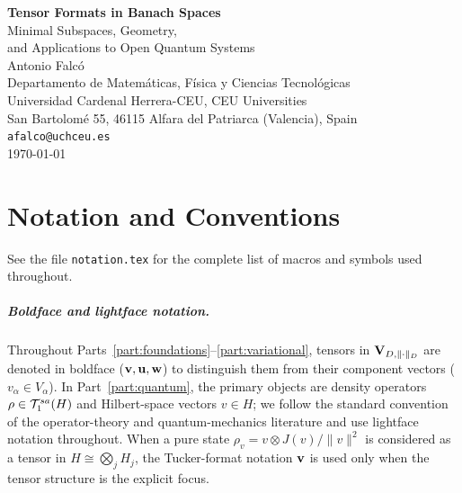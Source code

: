 \documentclass[12pt, a4paper, twoside, openright]{book}
\theoremstyle{plain}
\theoremstyle{definition}
\theoremstyle{remark}
\begin{document}
\frontmatter

\begin{titlepage}
\begin{center}
\vspace*{3cm}
{\Huge\bfseries Tensor Formats in Banach Spaces}\\[1.5ex]
{\Large Minimal Subspaces, Geometry,\\[0.5ex]
and Applications to Open Quantum Systems}\\[4cm]
{\Large Antonio Falcó}\\[1ex]
{\normalsize Departamento de Matemáticas, Física y Ciencias Tecnológicas\\
Universidad Cardenal Herrera-CEU, CEU Universities\\
San Bartolomé 55, 46115 Alfara del Patriarca (Valencia), Spain\\[0.5ex]
\texttt{afalco@uchceu.es}}\\[3cm]
{\small \today}
\end{center}
\end{titlepage}

\tableofcontents



\chapter*{Notation and Conventions}
\label{chap:notation}
See the file \texttt{notation.tex} for the complete list of macros
and symbols used throughout.

\paragraph{Boldface and lightface notation.}
Throughout Parts~\ref{part:foundations}--\ref{part:variational},
tensors in $\mathbf{V}_{D,\|\cdot\|_D}$ are denoted in boldface ($\mathbf{v}, \mathbf{u}, \mathbf{w}$)
to distinguish them from their component vectors ($v_\alpha \in
V_\alpha$). In Part~\ref{part:quantum}, the primary objects are
density operators $\rho \in \mathcal{T}_{1}^{sa}(H)$ and Hilbert-space vectors
$v \in H$; we follow the standard convention of the operator-theory
and quantum-mechanics literature and use lightface notation throughout.
When a pure state $\rho_v = v \otimes J(v)/\|v\|^2$ is considered
as a tensor in $H \cong \bigotimes_j H_j$, the Tucker-format notation
$\mathbf{v}$ is used only when the tensor structure is the explicit focus.
\end{document}
